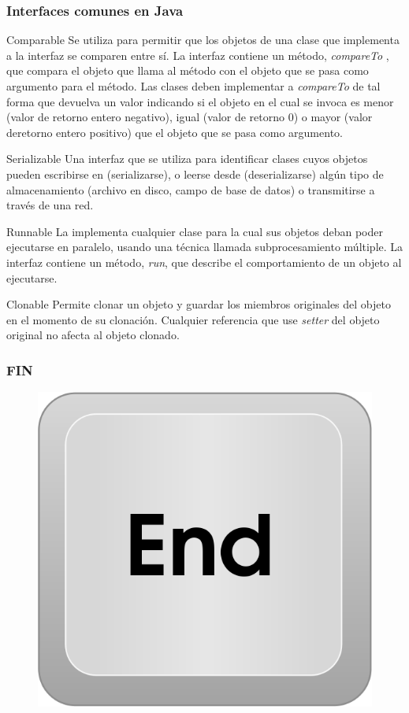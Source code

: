 \documentclass{beamer}
\begin{document}
\begin{frame}
\frametitle{Interfaces comunes en Java}
\begin{tiny}
\begin{block}{Comparable}
Se utiliza para permitir que los objetos de una clase que implementa a la interfaz se comparen entre sí. La interfaz contiene un método, \emph{compareTo} , que compara el objeto que llama al método con el objeto que se pasa como argumento para el método. Las clases deben implementar a \emph{compareTo} de tal forma que devuelva un valor indicando si el objeto en el cual se invoca es menor (valor de retorno entero negativo), igual (valor de retorno 0) o mayor (valor deretorno entero positivo) que el objeto que se pasa como argumento.
\end{block}
\pause
\begin{block}{Serializable}
Una interfaz que se utiliza para identificar clases cuyos objetos pueden escribirse en (serializarse), o leerse desde (deserializarse) algún tipo de almacenamiento (archivo en disco, campo de base de datos) o transmitirse a través de una red.
\end{block}
\pause
\begin{block}{Runnable}
La implementa cualquier clase para la cual sus objetos deban poder ejecutarse en paralelo, usando una técnica llamada subprocesamiento múltiple. La interfaz contiene un método, \emph{run}, que describe el comportamiento de un objeto al ejecutarse.
\end{block}
\pause
\begin{block}{Clonable}
Permite clonar un objeto y guardar los miembros originales del objeto en el momento de su clonación. Cualquier referencia que use \emph{setter} del objeto original no afecta al objeto clonado.
\end{block}
\end{tiny}

\end{frame}


\begin{frame}
\frametitle{FIN}
\begin{figure}
\includegraphics[scale=0.4]{imagenes/end.png}
\end{figure}
\end{frame}
\end{document}

